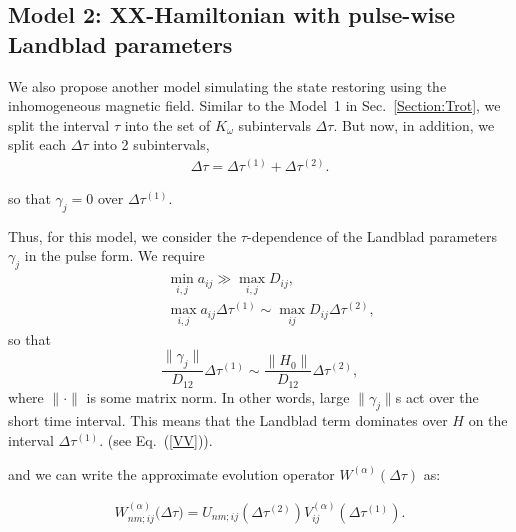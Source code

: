 \documentclass[pra,preprint,showpacs]{revtex4-1}
\begin{document}
{\subsection{Model 2: XX-Hamiltonian with pulse-wise Landblad parameters}
\label{Section:Model2}
We also propose another model simulating the state restoring using the inhomogeneous magnetic field.
Similar to the Model~1 in Sec.~\ref{Section:Trot}, we split the interval $\tau$ into the set of $K_\omega$ subintervals $\Delta \tau$. But now, in addition,  we split
each $\Delta \tau$ into 2 subintervals,
\begin{eqnarray}\label{subint}
\Delta \tau= \Delta \tau^{(1)}+ \Delta \tau^{(2)}.
\end{eqnarray}
\iffalse
so that
\begin{eqnarray}\label{HHj}
H_j=\left\{ \begin{array}{ll}
H_0, & \tau \in \Delta\tau^{(1)}\cr
H_0 + \Omega_j, & \tau \in \Delta\tau^{(2)}
\end{array}
\right.
\end{eqnarray}
\fi
so that $\gamma_j=0$ over $\Delta\tau^{(1)}$.
{Thus, for this model,  we consider the $\tau$-dependence of the Landblad parameters $\gamma_j$  in the pulse form. %
We require
\begin{eqnarray}\label{avar}
&&
\min_{i,j} a_{ij} \gg \max_{i,j} D_{ij}, \\\nonumber
&&\max_{i, j}a_{ij} \Delta \tau^{(1)}\sim \max_{ij}D_{ij} \Delta \tau^{(2)},
\end{eqnarray}
so that
$$
\frac{\|\gamma_j\|}{D_{12}} \Delta\tau^{(1)} \sim \frac{\|H_0\|}{D_{12}} \Delta\tau^{(2)}  ,
$$
where $\|\cdot\|$ is some matrix norm. In other words,  large $\|\gamma_j\|$s act over the short time interval. This means that the Landblad term dominates  over $H$ on the interval
$\Delta\tau^{(1)}$.
 (see Eq.~(\ref{VV})).
\iffalse
Therefore we can approximate Hamiltonian~(\ref{HHj}) as
\begin{eqnarray}\label{HHj2}
H_j\approx \left\{ \begin{array}{ll}
H_0, & \tau \in \Delta\tau^{(2)}\cr
\Omega_j, & \tau \in \Delta\tau^{(1)}
\end{array}
\right.
\end{eqnarray}
\fi
and we can write the approximate evolution operator $W^{(\alpha)}(\Delta \tau)$ as:
\iffalse
\begin{eqnarray}\label{Vj}
U_j(\Delta \tau)=    e^{-i \frac{H_0}{D_{12}} \Delta\tau^{(1)}}  e^{-i \frac{H_0+\Omega_j}{D_{12}} \Delta\tau^{(2)}} \approx
  e^{-i \frac{H_0}{D_{12}} \Delta\tau^{(1)}}e^{-i \frac{\Omega_j}{D_{12}} \Delta\tau^{(2)}}.
\end{eqnarray}
\fi
\begin{eqnarray}\label{Walpha2}
W^{(\alpha)}_{nm;ij}\Big({\Delta \tau}\Big)  =   U_{nm;ij}(\Delta\tau^{(2)})V^{(\alpha)}_{ij}       (\Delta\tau^{(1)}).
\end{eqnarray}

}}
\end{document}
